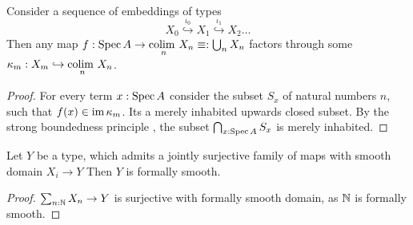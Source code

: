 \documentclass{article}
\begin{document}
\begin{lemma}{\label{lemma:StrongBoundedness}}
	Consider a sequence of embeddings of types 
	\[
	X_0 \overset{\iota_0}{\hookrightarrow} X_1 \overset{\iota_1}{\hookrightarrow} X_2 \hdots
	\]
	Then any map $f : \operatorname{Spec} A \to \underset{n}{\mathrm{colim} \ } X_n \equiv: \bigcup_n X_n$ factors through some $\kappa_m : X_m \hookrightarrow \underset{n}{\mathrm{colim} \ } X_n$.
\end{lemma}
\begin{proof}	
	For every term $x : \operatorname{Spec} A$ consider the subset $S_x$ of natural numbers $n$, such that $f(x) \in \operatorname{im} \kappa_m$. Its a merely inhabited upwards closed subset. By the strong boundedness principle \todocite, the subset $\bigcap_{x : \operatorname{Spec} A} S_x$ is merely inhabited.
\end{proof}
\begin{lemma}{\label{lemma:SeqUnionSmooth}}

	Let $Y$ be a type, which admits a jointly surjective family of maps with smooth domain $X_i \to Y$ %
	Then $Y$ is formally smooth. %
\end{lemma}
\begin{proof}
	$ \sum_{n : \mathbb{N}} X_n \to Y$ is surjective with formally smooth domain, as $\mathbb{N}$ is formally smooth.
\end{proof}
\end{document}
